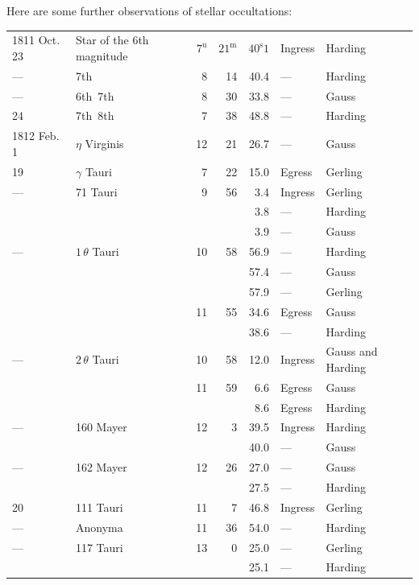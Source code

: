 \par\indent Here are some further observations of stellar occultations:

\begin{center}\fontsize{9}{11}\selectfont\setlength{\tabcolsep}{2pt}\renewcommand{\arraystretch}{1.15}\begin{tabular}{llrrrll}
1811 Oct. 23 & Star of the 6th magnitude & $7^{\mathrm u}$ & $21^{\mathrm m}$ & $40^{\mathrm s}1$ & Ingress & Harding\\
— & 7th & 8 & 14 & 40.4 & — & Harding\\
— & 6th\ 7th & 8 & 30 & 33.8 & — & Gauss\\
24 & 7th\ 8th & 7 & 38 & 48.8 & — & Harding\\
1812 Feb. 1 & $\eta$ Virginis & 12 & 21 & 26.7 & — & Gauss\\
19 & $\gamma$ Tauri & 7 & 22 & 15.0 & Egress & Gerling\\
— & 71 Tauri & 9 & 56 & 3.4 & Ingress & Gerling\\
 &  &  &  & 3.8 & — & Harding\\
 &  &  &  & 3.9 & — & Gauss\\
— & $1\,\theta$ Tauri & 10 & 58 & 56.9 & — & Harding\\
 &  &  &  & 57.4 & — & Gauss\\
 &  &  &  & 57.9 & — & Gerling\\
 &  & 11 & 55 & 34.6 & Egress & Gauss\\
 &  &  &  & 38.6 & — & Harding\\
— & $2\,\theta$ Tauri & 10 & 58 & 12.0 & Ingress & Gauss and Harding\\
 &  & 11 & 59 & 6.6 & Egress & Gauss\\
 &  &  &  & 8.6 & Egress & Harding\\
— & 160 Mayer & 12 & 3 & 39.5 & Ingress & Harding\\
 &  &  &  & 40.0 & — & Gauss\\
— & 162 Mayer & 12 & 26 & 27.0 & — & Gauss\\
 &  &  &  & 27.5 & — & Harding\\
20 & 111 Tauri & 11 & 7 & 46.8 & Ingress & Gerling\\
— & Anonyma & 11 & 36 & 54.0 & — & Harding\\
— & 117 Tauri & 13 & 0 & 25.0 & — & Gerling\\
 &  &  &  & 25.1 & — & Harding\\
\end{tabular}\end{center}

